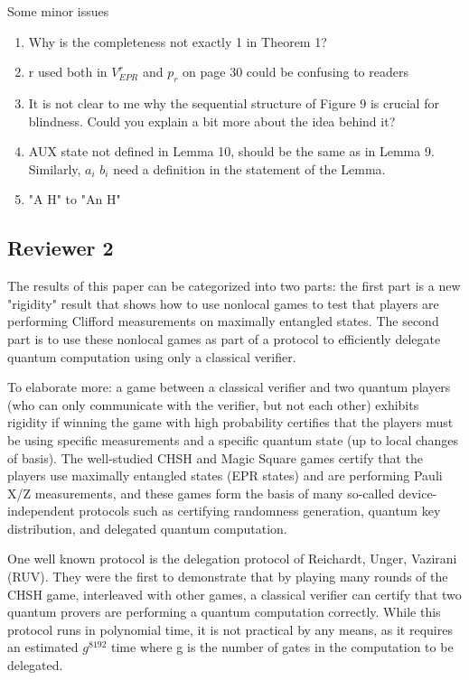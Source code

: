 \documentclass[12pt]{article}
\begin{document}
Some minor issues

\begin{enumerate}
    \item  Why is the completeness not exactly 1 in Theorem 1?
\item r used both in $V^r_{EPR}$ and $p_r$ on page 30 could be confusing to readers
\item It is not clear to me why the sequential structure of Figure 9 is crucial for blindness. Could you explain a bit more about the idea behind it?
\item AUX state not defined in Lemma 10, should be the same as in Lemma 9. Similarly, $a_i$ $b_i$ need a definition in the statement of the Lemma.
\item "A H" to "An H"
\end{enumerate}

	
\subsection*{Reviewer 2}

The results of this paper can be categorized into two parts: the first part is a new "rigidity" result that shows how to use nonlocal games to test that players are performing Clifford measurements on maximally entangled states. The second part is to use these nonlocal games as part of a protocol to efficiently delegate quantum computation using only a classical verifier.

To elaborate more: a game between a classical verifier and two quantum players (who can only communicate with the verifier, but not each other) exhibits rigidity if winning the game with high probability certifies that the players must be using specific measurements and a specific quantum state (up to local changes of basis). The well-studied CHSH and Magic Square games certify that the players use maximally entangled states (EPR states) and are performing Pauli X/Z measurements, and these games form the basis of many so-called device-independent protocols such as certifying randomness generation, quantum key distribution, and delegated quantum computation.

One well known protocol is the delegation protocol of Reichardt, Unger, Vazirani (RUV). They were the first to demonstrate that by playing many rounds of the CHSH game, interleaved with other games, a classical verifier can certify that two quantum provers are performing a quantum computation correctly. While this protocol runs in polynomial time, it is not practical by any means, as it requires an estimated $g^{8192}$ time where g is the number of gates in the computation to be delegated.
\end{document}

